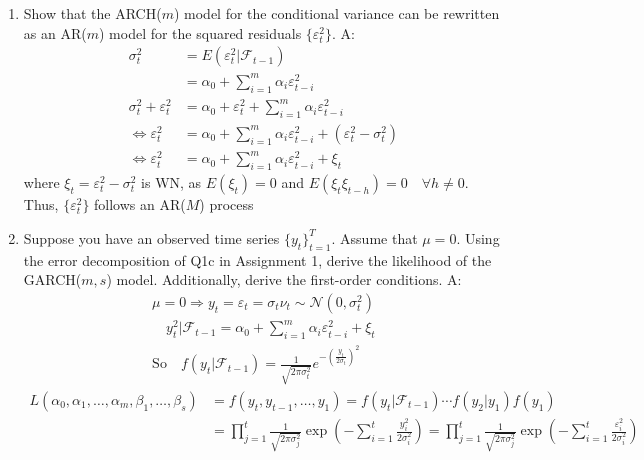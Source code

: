 \documentclass{article}
\begin{document}
\begin{enumerate}
    \item[(a)] Show that the ARCH($m$) model for the conditional variance can be rewritten as an AR($m$) model for the squared residuals $\{\varepsilon_t^2\}$. \newline \newline
    A: 
    \begin{align}
    \sigma_t^2 &= E(\varepsilon_t^2 | \mathcal{F}_{t-1}) \\ &= \alpha_0 + \sum_{i=1}^m \alpha_i \varepsilon_{t-i}^2 \\
    \sigma_t^2 + \varepsilon_t^2 &= \alpha_0 + \varepsilon_t^2 + \sum_{i=1}^m \alpha_i \varepsilon_{t-i}^2 \\
    \Leftrightarrow \varepsilon_t^2 &= \alpha_0 + \sum_{i=1}^m \alpha_i \varepsilon_{t-i}^2 + (\varepsilon_t^2 - \sigma_t^2) \\
    \Leftrightarrow \varepsilon_t^2 &= \alpha_0 + \sum_{i=1}^m \alpha_i \varepsilon_{t-i}^2 + \xi_t
    \end{align}
    where $\xi_t = \varepsilon_t^2 - \sigma_t^2$ is WN, as $E(\xi_t) = 0$ and $E(\xi_t \xi_{t-h}) = 0 \quad \forall h \neq 0$.
    Thus, $\{\varepsilon_t^2\}$ follows an AR($M$) process
    \newpage
    \item[(b)] Suppose you have an observed time series $\{y_t\}_{t=1}^T$. Assume that $\mu = 0$. Using the error decomposition of Q1c in Assignment 1, derive the likelihood of the GARCH($m, s$) model. Additionally, derive the first-order conditions. \newline \newline
    A:
    \begin{align}
    \mu = 0 \Rightarrow y_t = \varepsilon_t = \sigma_t \nu_t \sim \mathcal{N}(0, \sigma_t^2) \\
    \quad y_t^2 | \mathcal{F}_{t-1} = \alpha_0 + \sum_{i=1}^m \alpha_i \varepsilon_{t-i}^2 + \xi_t \\
    \text{So} \quad f(y_t | \mathcal{F}_{t-1}) = \frac{1}{\sqrt{2\pi\sigma_t^2}} e^{ -\left(\frac{y_t}{2\sigma_t} \right)^2}
    \end{align}
    \begin{align}
    L(\alpha_0, \alpha_1, \dots, \alpha_m, \beta_1, \dots, \beta_s) &= f(y_t, y_{t-1}, \dots, y_1) = f(y_t | \mathcal{F}_{t-1}) \cdots f(y_2 | y_1) f(y_1) \\
    &= \prod_{j=1}^t \frac{1}{\sqrt{2\pi\sigma_j^2}} \exp \left( -\sum_{i=1}^t \frac{y_i^2}{2\sigma_i^2} \right) = \prod_{j=1}^t \frac{1}{\sqrt{2\pi\sigma_j^2}} \exp \left( -\sum_{i=1}^t \frac{\varepsilon_i^2}{2\sigma_i^2} \right) \\

\end{align}
\end{enumerate}
\end{document}
